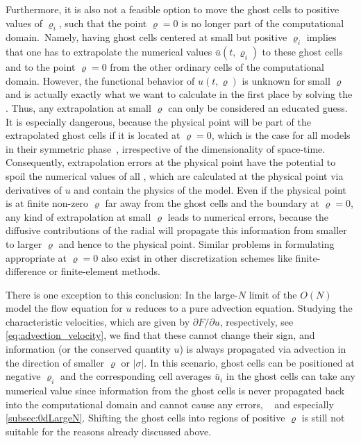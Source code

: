 Furthermore, it is also not a feasible option to move the ghost cells to positive values of $\varrho_i$, such that the point $\varrho = 0$ is no longer part of the computational domain.\
Namely, having ghost cells centered at small but positive $\varrho_i$ implies that one has to extrapolate the numerical values $\bar{u} ( t, \varrho_i )$ to these ghost cells and to the point $\varrho = 0$ from the other ordinary cells of the computational domain.
However, the functional behavior of $u ( t, \varrho )$ is unknown for small $\varrho$ and is actually exactly what we want to calculate in the first place by solving the \pde{}.
Thus, any extrapolation at small $\varrho$ can only be considered an educated guess.
It is especially dangerous, because the physical point will be part of the extrapolated ghost cells if it is located at $\varrho = 0$, which is the case for all models in their symmetric phase~\cite{Stoll:2021ori}, irrespective of the dimensionality of space-time.
Consequently, extrapolation errors at the physical point have the potential to spoil the numerical values of all \nptFunctions{}, which are calculated at the physical point via derivatives of $u$ and contain the physics of the model.
Even if the physical point is at finite non-zero $\varrho$ far away from the ghost cells and the boundary at $\varrho = 0$, any kind of extrapolation at small $\varrho$ leads to numerical errors, because the diffusive contributions of the radial \sigmaMode{} will propagate this information from smaller to larger $\varrho$ and hence to the physical point.
Similar problems in formulating appropriate \bcs{} at $\varrho = 0$ also exist in other discretization schemes like finite-difference or finite-element methods.

There is one exception to this conclusion: In the large-$N$ limit of the $O(N)$ model the flow equation for $u$ reduces to a pure advection equation.
Studying the characteristic velocities, which are given by $\partial F/\partial u$, respectively, see \cref{eq:advection_velocity}, we find that these cannot change their sign, and information (or the conserved quantity $u$) is always propagated via advection in the direction of smaller $\varrho$ or $|\sigma|$.
In this scenario, ghost cells can be positioned at negative $\varrho_i$ and the corresponding cell averages $\bar{u}_i$ in the ghost cells can take any numerical value since information from the ghost cells is never propagated back into the computational domain and cannot cause any errors, \cf{}\  and especially \cref{subsec:0dLargeN}.
Shifting the ghost cells into regions of positive $\varrho$ is still not suitable for the reasons already discussed above.\bigskip

